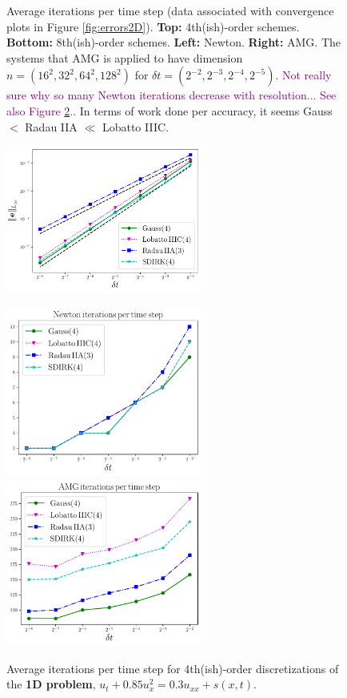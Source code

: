 \documentclass[review]{siamart}
\newcommand{\tcp}{\textcolor{purple}}
\begin{document}
\begin{figure}[H]
{}
\caption{Average iterations per time step (data associated with convergence plots in Figure \ref{fig:errors2D}). \textbf{Top:} 4th(ish)-order schemes. \textbf{Bottom:} 8th(ish)-order schemes. \textbf{Left:} Newton. \textbf{Right:} AMG. The systems that AMG is applied to have dimension $n = (16^2, 32^2, 64^2, 128^2)$ for $\delta t = (2^{-2}, 2^{-3}, 2^{-4}, 2^{-5})$. \tcp{Not really sure why so many Newton iterations decrease with resolution... See also Figure \ref{fig:iters1D}.}. In terms of work done per accuracy, it seems  Gauss $<$ Radau IIA $\ll$ Lobatto IIIC.
\label{fig:iters2D}
}
\end{figure}


\begin{figure}[H]
\centerline{
\includegraphics[width = 0.575\textwidth]{figures/errors_iters_O4_dim1}
}
\centerline{
\includegraphics[width = 0.575\textwidth]{figures/newton_iters_O4_dim1}
\quad
\includegraphics[width = 0.575\textwidth]{figures/amg_iters_O4_dim1}
}
\caption{Average iterations per time step for 4th(ish)-order discretizations of the \textbf{1D problem}, $u_t + 0.85 u^2_x = 0.3u_{xx} + s(x,t)$. 
\label{fig:iters1D}
}
\end{figure}
\end{document}
